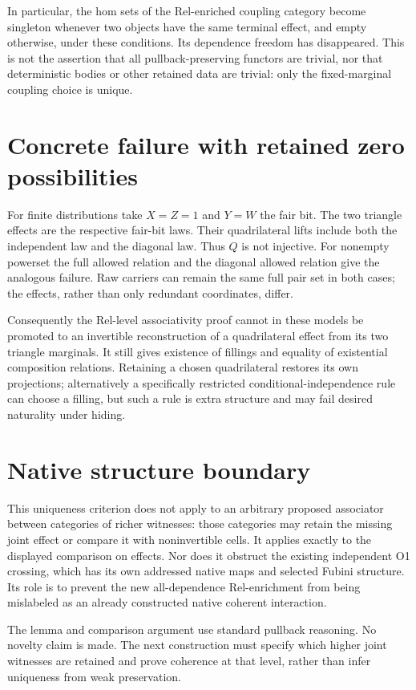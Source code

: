 \documentclass[11pt]{article}
\begin{document}
In particular, the hom sets of the Rel-enriched coupling category become singleton whenever two objects have the same terminal effect, and empty otherwise, under these conditions. Its dependence freedom has disappeared. This is not the assertion that all pullback-preserving functors are trivial, nor that deterministic bodies or other retained data are trivial: only the fixed-marginal coupling choice is unique.

\section{Concrete failure with retained zero possibilities}
For finite distributions take $X=Z=1$ and $Y=W$ the fair bit. The two triangle effects are the respective fair-bit laws. Their quadrilateral lifts include both the independent law and the diagonal law. Thus $Q$ is not injective. For nonempty powerset the full allowed relation and the diagonal allowed relation give the analogous failure. Raw carriers can remain the same full pair set in both cases; the effects, rather than only redundant coordinates, differ.

Consequently the Rel-level associativity proof cannot in these models be promoted to an invertible reconstruction of a quadrilateral effect from its two triangle marginals. It still gives existence of fillings and equality of existential composition relations. Retaining a chosen quadrilateral restores its own projections; alternatively a specifically restricted conditional-independence rule can choose a filling, but such a rule is extra structure and may fail desired naturality under hiding.

\section{Native structure boundary}
This uniqueness criterion does not apply to an arbitrary proposed associator between categories of richer witnesses: those categories may retain the missing joint effect or compare it with noninvertible cells. It applies exactly to the displayed comparison on effects. Nor does it obstruct the existing independent O1 crossing, which has its own addressed native maps and selected Fubini structure. Its role is to prevent the new all-dependence Rel-enrichment from being mislabeled as an already constructed native coherent interaction.

The lemma and comparison argument use standard pullback reasoning. No novelty claim is made. The next construction must specify which higher joint witnesses are retained and prove coherence at that level, rather than infer uniqueness from weak preservation.
\end{document}

